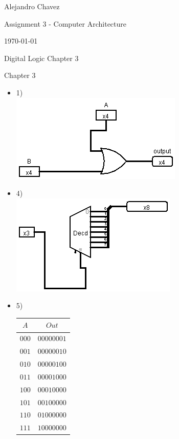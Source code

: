 \documentclass{article}
\begin{document}
\hfill Alejandro Chavez

\hfill Assignment 3 - Computer Architecture

\hfill \today\\

\begin{center}\begin{large}Digital Logic Chapter 3\end{large}\end{center}	Chapter 3
\begin{itemize}
	\item
		1)\\
	  \includegraphics[scale=0.5]{assignment3bitwiseor.png}
  \item
		4)\\
	  \includegraphics[scale=0.5]{assignment33to8decoder.png}
	\item
		5)\\

		\begin{tabular}{c|c}
    $A$ & $Out$ \\ \hline
    $000$ & $00000001$ \\
    $001$ & $00000010$ \\
    $010$ & $00000100$ \\
    $011$ & $00001000$ \\
    $100$ & $00010000$ \\
    $101$ & $00100000$ \\
    $110$ & $01000000$ \\
    $111$ & $10000000$ \\
		\end{tabular}\\
	

\end{itemize}
\end{document}
